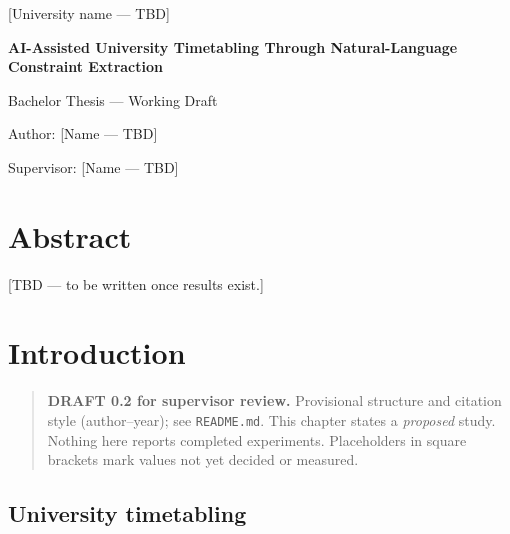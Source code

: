 \documentclass[
  11pt,a4paper,oneside]{report}
\author{}
\date{}
\begin{document}
\begin{titlepage}
\centering
{\large [University name --- TBD]\par{}\par}
\vspace{2.5cm}
{\Huge\bfseries AI-Assisted University Timetabling Through Natural-Language Constraint Extraction\par}
\vspace{1.5cm}
{\Large Bachelor Thesis --- Working Draft\par}
\vspace{2cm}
{\large Author: [Name --- TBD]\par Supervisor: [Name --- TBD]\par [Month Year --- TBD]\par}
\vfill
{}
\end{titlepage}
\chapter*{Abstract}
[TBD --- to be written once results exist.]
\tableofcontents
\clearpage

\hypertarget{introduction}{%
\chapter{Introduction}\label{introduction}}

\begin{quote}
\textbf{DRAFT 0.2 for supervisor review.} Provisional structure and
citation style (author--year); see \texttt{README.md}. This chapter
states a \emph{proposed} study. Nothing here reports completed
experiments. Placeholders in square brackets mark values not yet decided
or measured.
\end{quote}

\hypertarget{university-timetabling}{%
\section{University timetabling}\label{university-timetabling}}
\end{document}

